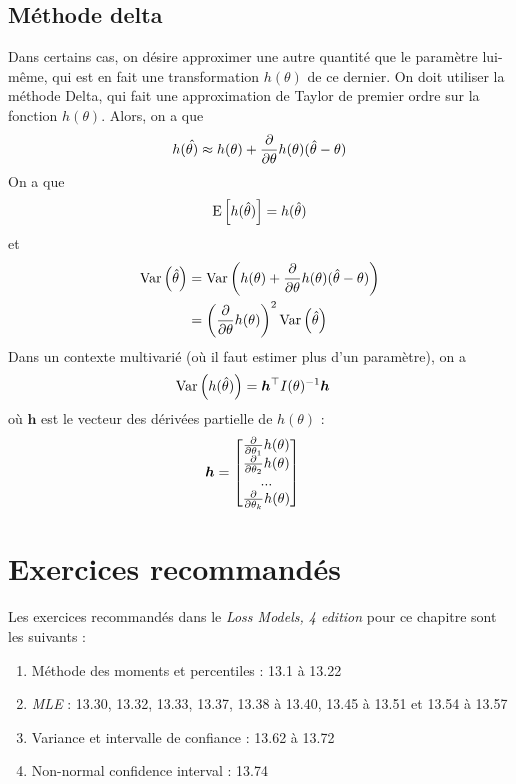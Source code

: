 \documentclass[12pt, french]{report}
\begin{document}
\subsection{Méthode delta}
Dans certains cas, on désire approximer une autre quantité que le paramètre lui-même, qui est en fait une transformation $h(\theta)$ de ce dernier. On doit utiliser la méthode Delta, qui fait une approximation de Taylor de premier ordre sur la fonction $h(\theta)$. Alors, on a que
\begin{align*}
h(\hat{\theta)} \approx h(\theta) + \frac{\partial}{\partial \theta} h(\theta) (\hat{\theta} - \theta)
\end{align*}
On a que
\begin{align*}
\mathrm{E} \left[ h(\hat{\theta}) \right] = h(\hat{\theta})
\end{align*}
et
\begin{align*}
\mathrm{Var} \left( \hat{\theta} \right)	& = \mathrm{Var} \left( h(\theta) +   \frac{\partial}{\partial \theta} h(\theta) (\hat{\theta} - \theta) \right) \\
& = \left( \frac{\partial}{\partial \theta} h(\theta) \right)^2 \mathrm{Var} \left( \hat{\theta} \right) \\
\end{align*}
Dans un contexte multivarié (où il faut estimer plus d'un paramètre), on a
\begin{align*}
\mathrm{Var} \left( h(\hat{\theta}) \right)	& = \bm{h}^{\top} I(\theta)^{-1} \bm{h}
\end{align*}
où $\bm{h}$ est le vecteur des dérivées partielle de $h(\theta)$ : 
\begin{align*}
\bm{h}	& = 
\begin{bmatrix}
\frac{\partial}{\partial \theta_1} h(\theta) \\
\frac{\partial}{\partial \theta_2} h(\theta) \\
... \\
\frac{\partial}{\partial \theta_k} h(\theta) \\
\end{bmatrix}
\end{align*}






\section{Exercices recommandés}
Les exercices recommandés dans le \emph{Loss Models, 4 edition} pour ce chapitre sont les suivants : 
\begin{enumerate}[label=\faAngleRight]
\item Méthode des moments et percentiles : 13.1 à 13.22
\item \emph{MLE} : 13.30, 13.32, 13.33, 13.37, 13.38 à 13.40, 13.45 à 13.51 et 13.54 à 13.57
\item Variance et intervalle de confiance : 13.62 à 13.72
\item Non-normal confidence interval : 13.74 
\end{enumerate}
\end{document}

